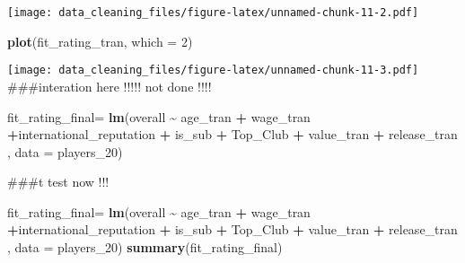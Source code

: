 \documentclass[
]{article}
\newenvironment{Shaded}{\begin{snugshade}}{\end{snugshade}}
\newcommand{\AttributeTok}[1]{\textcolor[rgb]{0.13,0.29,0.53}{#1}}
\newcommand{\DecValTok}[1]{\textcolor[rgb]{0.00,0.00,0.81}{#1}}
\newcommand{\FunctionTok}[1]{\textcolor[rgb]{0.13,0.29,0.53}{\textbf{#1}}}
\newcommand{\NormalTok}[1]{#1}
\newcommand{\OtherTok}[1]{\textcolor[rgb]{0.56,0.35,0.01}{#1}}
\newcommand{\SpecialCharTok}[1]{\textcolor[rgb]{0.81,0.36,0.00}{\textbf{#1}}}
\begin{document}
\texttt{[image: data\_cleaning\_files/figure-latex/unnamed-chunk-11-2.pdf]}

\begin{Shaded}
\begin{Highlighting}[]
\FunctionTok{plot}\NormalTok{(fit\_rating\_tran, }\AttributeTok{which =} \DecValTok{2}\NormalTok{)}
\end{Highlighting}
\end{Shaded}

\texttt{[image: data\_cleaning\_files/figure-latex/unnamed-chunk-11-3.pdf]}
\#\#\#interation here !!!!! not done !!!!

\begin{Shaded}
\begin{Highlighting}[]
\NormalTok{fit\_rating\_final}\OtherTok{=} \FunctionTok{lm}\NormalTok{(overall  }\SpecialCharTok{\textasciitilde{}}\NormalTok{ age\_tran }\SpecialCharTok{+}\NormalTok{ wage\_tran }\SpecialCharTok{+}\NormalTok{international\_reputation }\SpecialCharTok{+}\NormalTok{ is\_sub }
                          \SpecialCharTok{+}\NormalTok{ Top\_Club }\SpecialCharTok{+}\NormalTok{ value\_tran }\SpecialCharTok{+}\NormalTok{ release\_tran}
\NormalTok{                          , }\AttributeTok{data =}\NormalTok{ players\_20)}
\end{Highlighting}
\end{Shaded}

\#\#\#t test now !!!

\begin{Shaded}
\begin{Highlighting}[]
\NormalTok{fit\_rating\_final}\OtherTok{=} \FunctionTok{lm}\NormalTok{(overall  }\SpecialCharTok{\textasciitilde{}}\NormalTok{ age\_tran }\SpecialCharTok{+}\NormalTok{ wage\_tran }\SpecialCharTok{+}\NormalTok{international\_reputation }\SpecialCharTok{+}\NormalTok{ is\_sub }
                          \SpecialCharTok{+}\NormalTok{ Top\_Club }\SpecialCharTok{+}\NormalTok{ value\_tran }\SpecialCharTok{+}\NormalTok{ release\_tran}
\NormalTok{                          , }\AttributeTok{data =}\NormalTok{ players\_20)}
\FunctionTok{summary}\NormalTok{(fit\_rating\_final)}
\end{Highlighting}
\end{Shaded}
\end{document}
